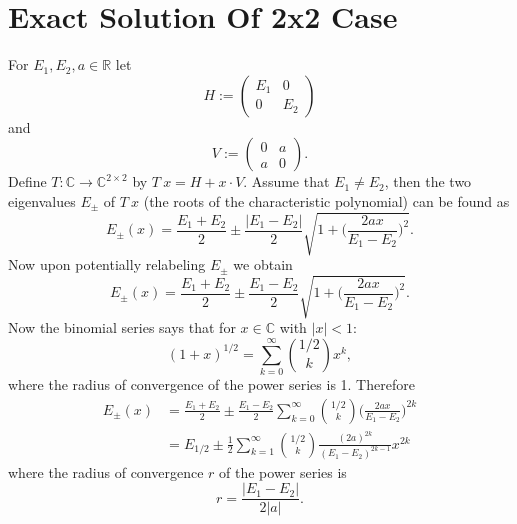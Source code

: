 \documentclass[11pt]{article}
\begin{document}
\section{Exact Solution Of 2x2 Case}

For $E_1, E_2, a \in \mathbb{R}$
let
$$H:=
\begin{pmatrix}
E_1 & 0 \\
0 & E_2
\end{pmatrix}$$
and
$$
V :=
\begin{pmatrix}
0 & a \\
a & 0
\end{pmatrix}.
$$
Define $T: \mathbb{C} \to \mathbb{C}^{2 \times 2}$
by $T \ x =  H + x \cdot V$.
Assume that $E_1 \neq E_2$, then
the two eigenvalues $E_\pm$ of $T \  x$ (the roots of the characteristic polynomial) can be found as
\begin{equation}
   E_\pm (x) =  \frac{E_{1}+ E_2}{2}
   \pm \frac{|E_1 -E_2|}{2} \sqrt{
    1 + \bigg(\frac{2 a x}{E_1-E_2}\bigg)^2
   }.
\end{equation}
Now upon potentially relabeling $E_\pm$ we obtain
\begin{equation}
    E_\pm (x) =  \frac{E_{1}+ E_2}{2}
    \pm \frac{E_1 -E_2}{2} \sqrt{
     1 + \bigg(\frac{2 a x}{E_1-E_2}\bigg)^2
    }.
 \end{equation}
Now the binomial series says that for $x \in \mathbb{C}$ with $|x|<1$:
\begin{equation}
    (1+x)^{1/2} = \sum_{k=0}^\infty
    {1/2 \choose k} x^k,
\end{equation}
where the radius of convergence of the power series is 1.
Therefore
\begin{equation}
    \begin{split}
        E_\pm (x) &=  \frac{E_{1}+ E_2}{2}
   \pm \frac{E_1 -E_2}{2} \sum_{k=0}^\infty
   {1/2 \choose k} \bigg(\frac{2 a x}{E_1-E_2}\bigg)^{2k} \\
   &= E_{1/2} \pm \frac{1}{2} \sum_{k=1}^\infty
   {1/2 \choose k} \frac{(2 a)^{2k}}{(E_1-E_2)^{2k-1}} x^{2k}
    \end{split}
\end{equation}
where the radius of convergence $r$ of the power series is
\begin{equation}
    r = \frac{|E_1 -E_2|}{2 |a|} .
\end{equation}
\end{document}
